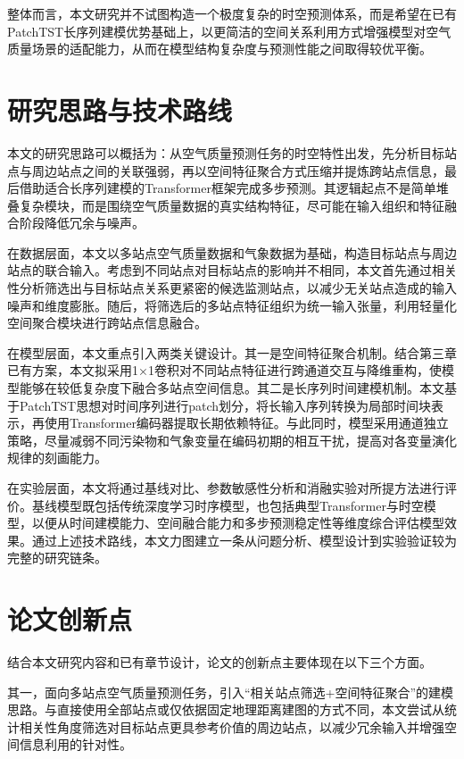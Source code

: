 整体而言，本文研究并不试图构造一个极度复杂的时空预测体系，而是希望在已有PatchTST长序列建模优势基础上，以更简洁的空间关系利用方式增强模型对空气质量场景的适配能力，从而在模型结构复杂度与预测性能之间取得较优平衡。

\section{研究思路与技术路线}

本文的研究思路可以概括为：从空气质量预测任务的时空特性出发，先分析目标站点与周边站点之间的关联强弱，再以空间特征聚合方式压缩并提炼跨站点信息，最后借助适合长序列建模的Transformer框架完成多步预测。其逻辑起点不是简单堆叠复杂模块，而是围绕空气质量数据的真实结构特征，尽可能在输入组织和特征融合阶段降低冗余与噪声。

在数据层面，本文以多站点空气质量数据和气象数据为基础，构造目标站点与周边站点的联合输入。考虑到不同站点对目标站点的影响并不相同，本文首先通过相关性分析筛选出与目标站点关系更紧密的候选监测站点，以减少无关站点造成的输入噪声和维度膨胀。随后，将筛选后的多站点特征组织为统一输入张量，利用轻量化空间聚合模块进行跨站点信息融合。

在模型层面，本文重点引入两类关键设计。其一是空间特征聚合机制。结合第三章已有方案，本文拟采用1×1卷积对不同站点特征进行跨通道交互与降维重构，使模型能够在较低复杂度下融合多站点空间信息。其二是长序列时间建模机制。本文基于PatchTST思想对时间序列进行patch划分，将长输入序列转换为局部时间块表示，再使用Transformer编码器提取长期依赖特征。与此同时，模型采用通道独立策略，尽量减弱不同污染物和气象变量在编码初期的相互干扰，提高对各变量演化规律的刻画能力。

在实验层面，本文将通过基线对比、参数敏感性分析和消融实验对所提方法进行评价。基线模型既包括传统深度学习时序模型，也包括典型Transformer与时空模型，以便从时间建模能力、空间融合能力和多步预测稳定性等维度综合评估模型效果。通过上述技术路线，本文力图建立一条从问题分析、模型设计到实验验证较为完整的研究链条。

\section{论文创新点}

结合本文研究内容和已有章节设计，论文的创新点主要体现在以下三个方面。

其一，面向多站点空气质量预测任务，引入“相关站点筛选+空间特征聚合”的建模思路。与直接使用全部站点或仅依据固定地理距离建图的方式不同，本文尝试从统计相关性角度筛选对目标站点更具参考价值的周边站点，以减少冗余输入并增强空间信息利用的针对性。

